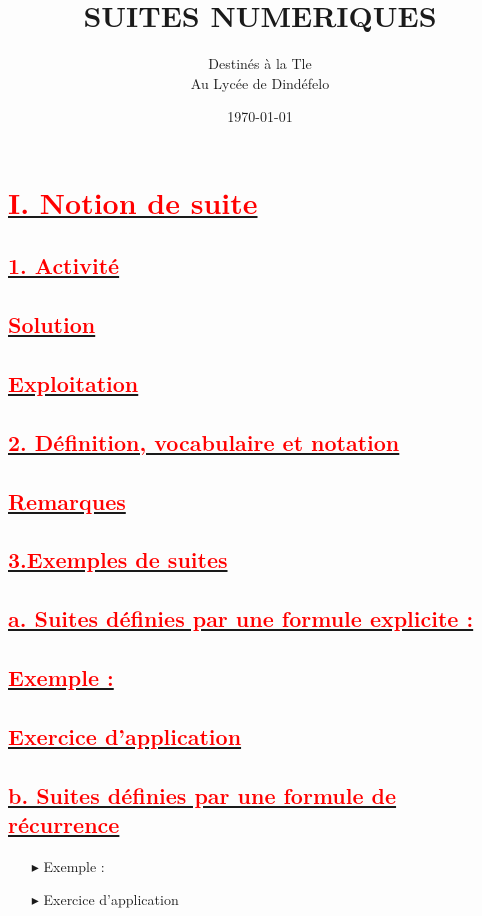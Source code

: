 \documentclass[12pt]{article}
\author{Destinés à la Tle\\Au Lycée de Dindéfelo}
\title{\textbf{SUITES NUMERIQUES}}
\date{\today}
\begin{document}
\maketitle
\newpage
\section*{\underline{\textbf{\textcolor{red}{I. Notion de suite}}}}
\subsection*{\underline{\textbf{\textcolor{red}{1. Activité}}}}
\subsection*{\underline{\textbf{\textcolor{red}{Solution}}}}
\subsection*{\underline{\textbf{\textcolor{red}{Exploitation}}}}
\subsection*{\underline{\textbf{\textcolor{red}{2. Définition, vocabulaire et notation}}}}
\subsection*{\underline{\textbf{\textcolor{red}{Remarques}}}}
\subsection*{\underline{\textbf{\textcolor{red}{3.Exemples de suites}}}}
\subsection*{\underline{\textbf{\textcolor{red}{a. Suites définies par une formule explicite :}}}}
\subsection*{\underline{\textbf{\textcolor{red}{Exemple :}}}}
\subsection*{\underline{\textbf{\textcolor{red}{Exercice d’application}}}}
\subsection*{\underline{\textbf{\textcolor{red}{b. Suites définies par une formule de récurrence}}}}
\begin{itemize}
\item[$\blacktriangleright$] Exemple :
\item[$\blacktriangleright$] Exercice d’application
\end{itemize}
\end{document}
